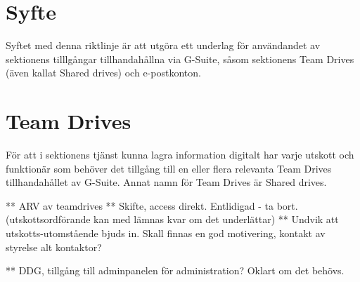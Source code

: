 \documentclass[10pt]{article}
\begin{document}
    \section*{\doctitle}
    \section{Syfte}
    
    Syftet med denna riktlinje är att utgöra ett underlag för användandet av sektionens tilllgångar tillhandahållna via G-Suite, såsom sektionens Team Drives (även kallat Shared drives) och e-postkonton. 
    


    \section{Team Drives}
    För att i sektionens tjänst kunna lagra information digitalt har varje utskott och funktionär som behöver det tillgång till en eller flera relevanta Team Drives tillhandahållet av G-Suite. Annat namn för Team Drives är Shared drives.

    ** ARV av teamdrives
    ** Skifte, access direkt. Entlidigad - ta bort. (utskottsordförande kan med lämnas kvar om det underlättar)
    ** Undvik att utskotts-utomstående bjuds in. Skall finnas en god motivering, kontakt av styrelse alt kontaktor?
    
    ** DDG, tillgång till adminpanelen för administration? Oklart om det behövs. 
\end{document}
